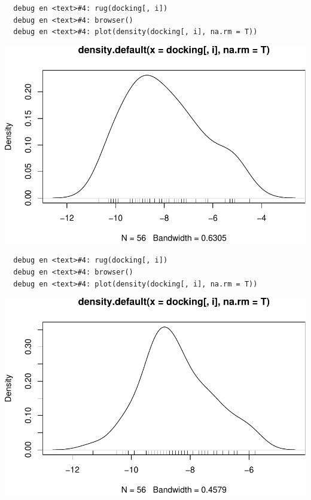 \documentclass[12pt,twoside]{reedthesis}
\begin{document}
  \begin{verbatim}
  debug en <text>#4: rug(docking[, i])
  debug en <text>#4: browser()
  debug en <text>#4: plot(density(docking[, i], na.rm = T))
  \end{verbatim}
  
  \begin{center}\includegraphics{tesis_files/figure-latex/johan-17} \end{center}
  
  \begin{verbatim}
  debug en <text>#4: rug(docking[, i])
  debug en <text>#4: browser()
  debug en <text>#4: plot(density(docking[, i], na.rm = T))
  \end{verbatim}
  
  \begin{center}\includegraphics{tesis_files/figure-latex/johan-18} \end{center}
  
\end{document}
